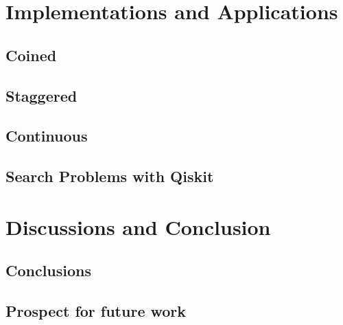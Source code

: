 \documentclass[
oneside,
11pt, a4paper,
footinclude=true,
headinclude=true,
cleardoublepage=empty
]{scrbook}
\begin{document}
\chapter{Implementations and Applications}\label{chap:qiskitImplementation}

\section{Coined}\label{sec:CoinedQiskit}

\section{Staggered}\label{sec:StagQiskit}

\section{Continuous}\label{sec:ContQiskit}

\section{Search Problems with Qiskit}\label{sec:SearchProblemsQiskit}


\chapter{Discussions and Conclusion}
\section{Conclusions}

\section{Prospect for future work}







\end{document}
